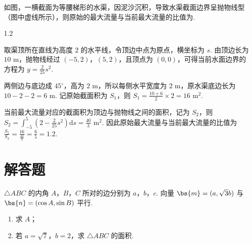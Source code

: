 \begin{problem}
如图，一横截面为等腰梯形的水渠，因泥沙沉积，导致水渠截面边界呈抛物线型（图中虚线所示），则原始的最大流量与当前最大流量的比值为\fillinblank{}.

\end{problem}

\begin{answer}
1.2
\end{answer}

\begin{solution}
取渠顶所在直线为高度 \(2\) 的水平线，令顶边中点为原点，横坐标为 \(s\). 由顶边长为 \(10\text{ m}\)，抛物线经过 \((-5,2)\)，\((5,2)\)，且顶点为 \((0,0)\)，可得当前水面边界的方程为
\(y=\frac{2}{25}s^{2}\).

两侧边与底边成 \(45^{\circ}\)，高为 \(2\text{ m}\)，所以每侧水平宽度为 \(2\text{ m}\)，原水渠底边长为 \(10-2-2=6\text{ m}\). 记原始截面积为 \(S_{1}\)，则
\(S_{1}=\frac{10+6}{2}\times2=16\text{ m}^{2}\).

当前最大流量对应的截面积为顶边与抛物线之间的面积，记为 \(S_{2}\)，则
\(S_{2}=\displaystyle\int_{-5}^{5}\left(2-\frac{2}{25}s^{2}\right)\mathrm{d}s=\frac{40}{3}\text{ m}^{2}\).
因此原始最大流量与当前最大流量的比值为
\(\frac{S_{1}}{S_{2}}=\frac{16}{\frac{40}{3}}=\frac{6}{5}=1.2\).
\end{solution}

\section{解答题}

\begin{problem}
\(\triangle ABC\) 的内角 \(A\)，\(B\)，\(C\) 所对的边分别为 \(a\)，\(b\)，\(c\). 向量 \(\bs{m} = (a, \sqrt{3} b)\) 与 \(\bs{n} = (\cos A, \sin B)\) 平行.

\begin{enumerate}
\item 求 \(A\)；
\item 若 \(a = \sqrt{7}\)，\(b = 2\)，求 \(\triangle ABC\) 的面积.
\end{enumerate}
\end{problem}

